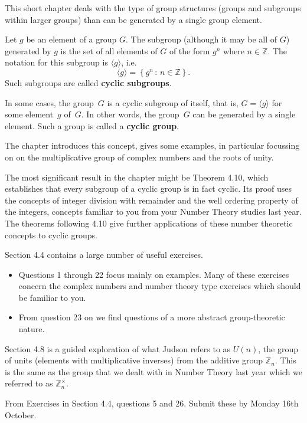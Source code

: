 \documentclass[oneside,10pt]{amsart}
\begin{document}

This short chapter deals with the type of group structures (groups and subgroups within larger groups) than can be generated by a single group element.

Let $g$ be an element of a group $G$. The subgroup (although it may be all of $G$) generated by $g$ is the set of all elements of $G$ of the form $g^n$ where $n \in \mathbb{Z}$. The notation for this subgroup is $\langle g \rangle$, i.e.
$$\langle g \rangle = \left \{ g^n \, : \, n \in \mathbb{Z} \right \}.$$ Such subgroups are called
\textbf{cyclic subgroups}.

In some cases, the group~$G$ is a cyclic subgroup of itself, that is,
$G=\langle g \rangle$ for some element~$g$ of~$G$.
In other words, the group~$G$ can be generated by a single element.
Such a group is called a \textbf{cyclic group}.

The chapter introduces this concept, gives some examples, in particular focussing on on the multiplicative group of complex numbers and the roots of unity.

The most significant result in the chapter might be Theorem 4.10,
which establishes that every subgroup of a cyclic group is in fact cyclic.
Its proof uses the concepts of integer division with remainder and the well ordering property of the integers,
concepts familiar to you from your Number Theory studies last year.
The theorems following 4.10 give further applications of these number theoretic concepts to cyclic groups.

\vskip 4pt

Section 4.4 contains a large number of useful exercises.

\begin{itemize}
\item
Questions 1 through 22 focus mainly on examples. Many of these exercises concern the complex numbers and number theory type exercises which should be familiar to you.
\item
From question 23 on we find questions of a more abstract group-theoretic nature.
\end{itemize}

\vskip 4pt

Section 4.8 is a guided exploration of what Judson refers to as $U(n)$, the group of units (elements with multiplicative inverses) from the additive group $\mathbb{Z}_n$. This is the same as the group that we dealt with in Number Theory last year which we referred to as $\mathbb{Z}_n^\times$.


From Exercises in Section 4.4, questions 5 and 26. Submit these by Monday 16th October.
\end{document}
